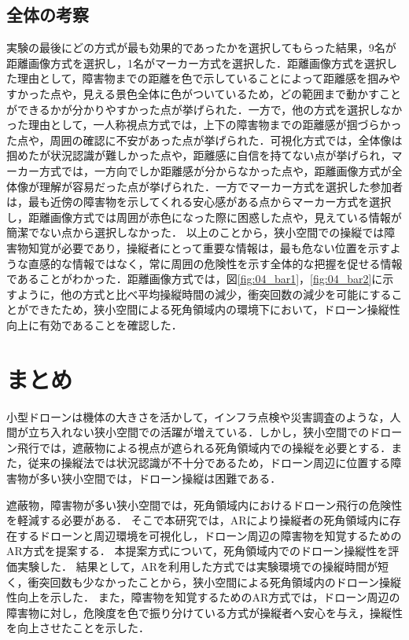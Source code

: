 \documentclass[submit]{ipsj}
\begin{document}
\subsection{全体の考察}
実験の最後にどの方式が最も効果的であったかを選択してもらった結果，9名が距離画像方式を選択し，1名がマーカー方式を選択した．距離画像方式を選択した理由として，障害物までの距離を色で示していることによって距離感を掴みやすかった点や，見える景色全体に色がついているため，どの範囲まで動かすことができるかが分かりやすかった点が挙げられた．一方で，他の方式を選択しなかった理由として，一人称視点方式では，上下の障害物までの距離感が掴づらかった点や，周囲の確認に不安があった点が挙げられた．可視化方式では，全体像は掴めたが状況認識が難しかった点や，距離感に自信を持てない点が挙げられ，マーカー方式では，一方向でしか距離感が分からなかった点や，距離画像方式が全体像が理解が容易だった点が挙げられた．一方でマーカー方式を選択した参加者は，最も近傍の障害物を示してくれる安心感がある点からマーカー方式を選択し，距離画像方式では周囲が赤色になった際に困惑した点や，見えている情報が簡潔でない点から選択しなかった．
以上のことから，狭小空間での操縦では障害物知覚が必要であり，操縦者にとって重要な情報は，最も危ない位置を示すような直感的な情報ではなく，常に周囲の危険性を示す全体的な把握を促せる情報であることがわかった．距離画像方式では，図\ref{fig:04_bar1}，\ref{fig:04_bar2}に示すように，他の方式と比べ平均操縦時間の減少，衝突回数の減少を可能にすることができたため，狭小空間による死角領域内の環境下において，ドローン操縦性向上に有効であることを確認した．


\section{まとめ}
\label{sec:Conclusion}
小型ドローンは機体の大きさを活かして，インフラ点検や災害調査のような，人間が立ち入れない狭小空間での活躍が増えている．しかし，狭小空間でのドローン飛行では，遮蔽物による視点が遮られる死角領域内での操縦を必要とする．また，従来の操縦法では状況認識が不十分であるため，ドローン周辺に位置する障害物が多い狭小空間では，ドローン操縦は困難である．\par
遮蔽物，障害物が多い狭小空間では，死角領域内におけるドローン飛行の危険性を軽減する必要がある．
そこで本研究では，ARにより操縦者の死角領域内に存在するドローンと周辺環境を可視化し，ドローン周辺の障害物を知覚するためのAR方式を提案する．
本提案方式について，死角領域内でのドローン操縦性を評価実験した．
結果として，ARを利用した方式では実験環境での操縦時間が短く，衝突回数も少なかったことから，狭小空間による死角領域内のドローン操縦性向上を示した．
また，障害物を知覚するためのAR方式では，ドローン周辺の障害物に対し，危険度を色で振り分けている方式が操縦者へ安心を与え，操縦性を向上させたことを示した．
\end{document}
